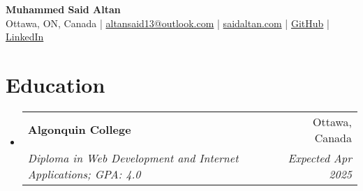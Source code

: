 \documentclass[letterpaper, 10pt]{article}
\makeatletter
\newcommand{\resumeSubheading}[4]{
  \vspace{-0.5em}\item 
    \begin{tabular*}{0.97\textwidth}[t]{l@{\extracolsep{\fill}}r}
      \textbf{#1} & #2 \\
      \textit{#3} & \textit{#4} \\
    \end{tabular*}\vspace{-1em}
}
\newcommand{\resumeSubHeadingListStart}{
  \begin{itemize}[leftmargin=0.5cm, label={}]
}
\newcommand{\resumeSubHeadingListEnd}{\end{itemize}}
\makeatother
\begin{document}
\begin{center}
    \textbf{\Huge Muhammed Said Altan} \\ 
    Ottawa, ON, Canada | \href{mailto:altansaid13@outlook.com}{altansaid13@outlook.com} | 
    \href{https://saidaltan.com}{saidaltan.com} | \href{https://github.com/altansaid}{GitHub} | 
    \href{https://linkedin.com/in/saidaltan}{LinkedIn}
\end{center}

\section{Education}
\resumeSubHeadingListStart
    \resumeSubheading
      {Algonquin College}{Ottawa, Canada}
      {Diploma in Web Development and Internet Applications; GPA: 4.0}{Expected Apr 2025}
\resumeSubHeadingListEnd

\end{document}
